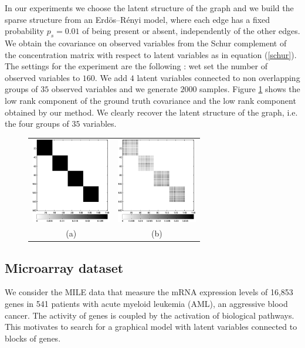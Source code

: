 In our experiments we choose the latent structure of the graph and we build the sparse structure from an Erd\"os–R\'enyi model, where each edge has a fixed probability $p_{s}=0.01$ of being present or absent, independently of the other edges. We obtain the covariance on observed variables from the Schur complement of the concentration matrix with respect to latent variables as in equation (\ref{schur}). The settings for the experiment are the following : wet set the number of observed variables to $160$. We add $4$ latent variables connected to non overlapping groups of $35$ observed variables and we generate $2000$ samples. Figure \ref{fig:synthlarge} shows the low rank component of the ground truth covariance and the low rank component obtained by our method. We clearly recover the latent structure of the graph, i.e. the four groups of $35$ variables. \\


\begin{figure}
\label{fig:synthlarge}
\center
\begin{tabular}{cc}
    \includegraphics[width=3.5cm]{fig/M} 
  & \includegraphics[width=3.5cm]{fig/outputM} 
   \\    (a) & (b) \\[6pt]
\end{tabular}
\caption{}
\end{figure}

\subsection{Microarray dataset}

We consider the MILE data \citep{haferlach2010clinical} that measure the mRNA expression levels of 16,853 genes in 541 patients with acute myeloid leukemia (AML), an aggressive blood cancer. The activity of genes is coupled by the activation of biological pathways. This motivates to search for a graphical model with latent variables connected to blocks of genes.

